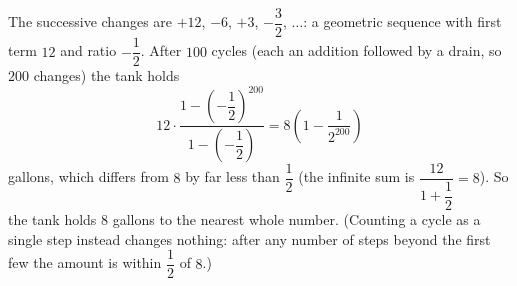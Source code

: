 The successive changes are $+12$, $-6$, $+3$, $-\dfrac{3}{2}$, $\dots$: a geometric sequence with first term $12$ and ratio $-\dfrac{1}{2}$. After $100$ cycles (each an addition followed by a drain, so $200$ changes) the tank holds
\[
12\cdot\dfrac{1-\left(-\dfrac{1}{2}\right)^{200}}{1-\left(-\dfrac{1}{2}\right)}=8\left(1-\dfrac{1}{2^{200}}\right)
\]
gallons, which differs from $8$ by far less than $\dfrac{1}{2}$ (the infinite sum is $\dfrac{12}{1+\dfrac{1}{2}}=8$). So the tank holds $\boxed{8}$ gallons to the nearest whole number. (Counting a cycle as a single step instead changes nothing: after any number of steps beyond the first few the amount is within $\dfrac{1}{2}$ of $8$.)
